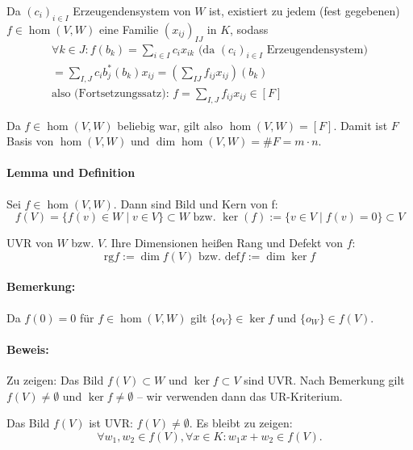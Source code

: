 	Da $(c_i)_{i\in I}$ Erzeugendensystem von $W$ ist, existiert zu jedem (fest gegebenen) $f\in\hom (V,W)$ eine Familie $(x_{ij})_{IJ}$ in $K$, sodass
		\begin{gather*}
		\forall k\in J: f(b_k) = \sum_{i\in I} c_i x_{ik} \text{ (da $(c_i)_{i\in I}$ Erzeugendensystem)}\\
		= \sum_{I,J}c_ib_j^*(b_k)x_{ij} = \left(\sum_{IJ} f_{ij}x_{ij}\right)(b_k)\\
		\text{also (Fortsetzungssatz): } f=\sum_{I,J}f_{ij}x_{ij} \in [F]
		\end{gather*}
	
	Da $f\in\hom (V,W)$ beliebig war, gilt also $\hom (V,W) = [F]$. Damit ist $F$ Basis von $\hom (V,W)$ und $\dim\hom (V,W) = \# F = m\cdot n$.
	
\paragraph{Lemma und Definition}
	Sei $f\in \hom (V,W)$. Dann sind Bild und Kern von f:
		\begin{equation*}
			f(V) = \{f(v)\in W\mid v\in V \}\subset W \text{ bzw. } \ker (f) := \{v\in V\mid f(v) = 0 \} \subset V
		\end{equation*}
	
	UVR von $W$ bzw. $V$. Ihre Dimensionen heißen Rang und Defekt von $f$:
		\begin{equation*}
			\text{rg} f := \dim f(V) \text{ bzw. } \text{def} f := \dim \ker f
		\end{equation*}

\paragraph{Bemerkung: }
	Da $f(0)=0$ für  $f\in \hom (V,W)$ gilt $\{o_V \}\in \ker f$ und $\{o_W \}\in f(V)$.

\paragraph{Beweis: }
	Zu zeigen: Das Bild $f(V)\subset W$ und $\ker f\subset V$ sind UVR. Nach Bemerkung gilt $f(V)\neq \emptyset$ und $\ker f \neq \emptyset$ -- wir verwenden dann das UR-Kriterium.
	
	Das Bild $f(V)$ ist UVR: $f(V) \neq \emptyset$. Es bleibt zu zeigen:
		\begin{equation*}
			\forall w_1,w_2\in f(V), \forall x\in K: w_1x+w_2 \in f(V).
		\end{equation*}
	
